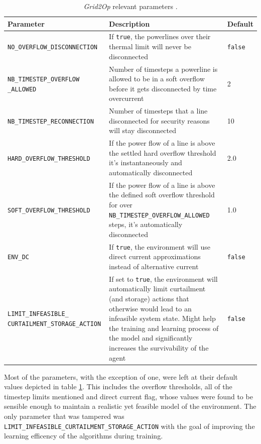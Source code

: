 \begin{table}[H] 
	\centering
	\caption{\textit{Grid2Op} relevant parameters \cite{rtefranceGrid2OpDocumentation}.}
	\begin{tabular}{p{6cm}p{6cm}p{1.5cm}}
		\toprule
		\textbf{Parameter} & \textbf{Description} & \textbf{Default} \\
		\midrule
		\texttt{NO\_OVERFLOW\_DISCONNECTION} & If \texttt{true}, the powerlines over their thermal limit will never be disconnected & \texttt{false} \\
		\texttt{NB\_TIMESTEP\_OVERFLOW \_ALLOWED} & Number of timesteps a powerline is allowed to be in a soft overflow before it gets disconnected by time overcurrent & 2 \\
		\texttt{NB\_TIMESTEP\_RECONNECTION} & Number of timesteps that a line disconnected for security reasons will stay disconnected & 10 \\
		\texttt{HARD\_OVERFLOW\_THRESHOLD} & If the power flow of a line is above the settled hard overflow threshold it's instantaneously and automatically disconnected & 2.0 \\
		\texttt{SOFT\_OVERFLOW\_THRESHOLD} & If the power flow of a line is above the defined soft overflow threshold for over \texttt{NB\_TIMESTEP\_OVERFLOW\_ALLOWED} steps, it's automatically disconnected & 1.0 \\
		\texttt{ENV\_DC} & If \texttt{true}, the environment will use direct current approximations instead of alternative current & \texttt{false} \\
		\texttt{LIMIT\_INFEASIBLE\_ CURTAILMENT\_STORAGE\_ACTION} & If set to \texttt{true}, the environment will automatically limit curtailment (and storage) actions that otherwise would lead to an infeasible system state. Might help the training and learning process of the model and significantly increases the survivability of the agent & \texttt{false} \\
		\bottomrule
	\end{tabular}
	\label{tab:grid-params}
\end{table}

Most of the parameters, with the exception of one, were left at their default values depicted in table \ref{tab:grid-params}. This includes the overflow thresholds, all of the timestep limits mentioned and direct current flag, whose values were found to be sensible enough to maintain a realistic yet feasible model of the environment. The only parameter that was tampered was \texttt{LIMIT\_INFEASIBLE\_CURTAILMENT\_STORAGE\_ACTION} with the goal of improving the learning efficency of the algorithms during training.

